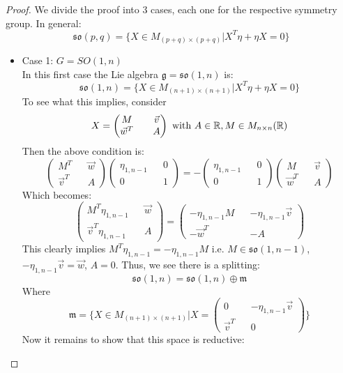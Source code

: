 \documentclass[12pt,a4paper]{report}
\theoremstyle{definition}
\theoremstyle{Theorem}
\theoremstyle{definition}
\theoremstyle{definition}
\begin{document}
	\begin{proof}
		We divide the proof into 3 cases, each one for the respective symmetry group.
		In general:
		$$\mathfrak{so}(p,q)=\{X\in M_{(p+q)\times(p+q)}|X^T\eta+\eta X=0\}$$
		\begin{itemize}
			\item Case 1: $G=SO(1,n)$
			\\
			In this first case the Lie algebra $\mathfrak{g}=\mathfrak{so}(1,n)$ is:
			$$\mathfrak{so}(1,n)=\{X\in M_{(n+1)\times(n+1)}|X^T\eta+\eta X=0\}$$
			To see what this implies, consider
			$$X=\begin{pmatrix}
				M && \vec{v} \\
				\vec{w}^T && A
			\end{pmatrix}\hbox{ with }A\in\mathbb{R},M\in M_{n\times n}(\mathbb{R})$$
			Then the above condition is:
			$$\begin{pmatrix}
				M^T && \vec{w} \\
				\vec{v}^T && A
			\end{pmatrix}\begin{pmatrix}
			\eta_{1,n-1} && 0 \\
			0 && 1
			\end{pmatrix}=-\begin{pmatrix}
			\eta_{1,n-1} && 0 \\
			0 && 1
			\end{pmatrix}\begin{pmatrix}
			M && \vec{v} \\
			\vec{w}^T && A
			\end{pmatrix}$$
			Which becomes:
			$$\begin{pmatrix}
				M^T\eta_{1,n-1} && \vec{w} \\
				\vec{v}^T\eta_{1,n-1} && A
			\end{pmatrix}=\begin{pmatrix}
			-\eta_{1,n-1}M && -\eta_{1,n-1}\vec{v} \\
			-\vec{w}^T && -A
			\end{pmatrix}$$
			This clearly implies $M^T\eta_{1,n-1}=-\eta_{1,n-1}M$ i.e. $M\in \mathfrak{so}(1,n-1)$, $-\eta_{1,n-1}\vec{v}=\vec{w}$, $A=0$. Thus, we see there is a splitting:
			$$\mathfrak{so}(1,n)=\mathfrak{so}(1,n)\oplus \mathfrak{m}$$
			Where 
			$$\mathfrak{m}=\{X\in M_{(n+1)\times (n+1)}|X=\begin{pmatrix}
				0 && -\eta_{1,n-1}\vec{v} \\
				\vec{v}^T && 0
			\end{pmatrix}\}$$
			Now it remains to show that this space is reductive:

\end{itemize}
\end{proof}
\end{document}
